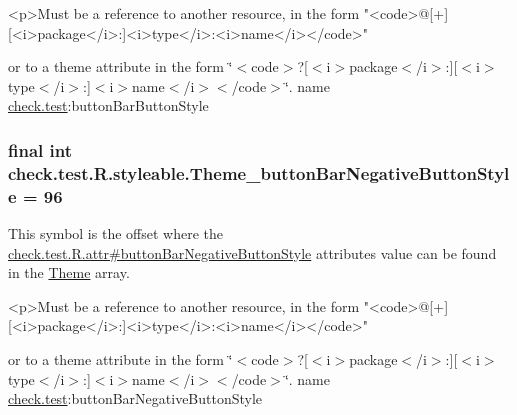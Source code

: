 \begin{DoxyVerb}      <p>Must be a reference to another resource, in the form "<code>@[+][<i>package</i>:]<i>type</i>:<i>name</i></code>"
\end{DoxyVerb}
 or to a theme attribute in the form \char`\"{}$<$code$>$?\mbox{[}$<$i$>$package$<$/i$>$\+:\mbox{]}\mbox{[}$<$i$>$type$<$/i$>$\+:\mbox{]}$<$i$>$name$<$/i$>$$<$/code$>$\char`\"{}.  name \hyperlink{namespacecheck_1_1test}{check.\+test}\+:button\+Bar\+Button\+Style \hypertarget{classcheck_1_1test_1_1_r_1_1styleable_aaf6d54b7d21dd82c42f35041e1ce1c92}{}
\subsubsection[{Theme\+\_\+button\+Bar\+Negative\+Button\+Style}]{\setlength{\rightskip}{0pt plus 5cm}final int check.\+test.\+R.\+styleable.\+Theme\+\_\+button\+Bar\+Negative\+Button\+Style = 96\hspace{0.3cm}{\ttfamily [static]}}\label{classcheck_1_1test_1_1_r_1_1styleable_aaf6d54b7d21dd82c42f35041e1ce1c92}
This symbol is the offset where the \hyperlink{classcheck_1_1test_1_1_r_1_1attr_aa15b2310541c468ff8359b79c844bdb6}{check.\+test.\+R.\+attr\#button\+Bar\+Negative\+Button\+Style} attribute\textquotesingle{}s value can be found in the \hyperlink{classcheck_1_1test_1_1_r_1_1styleable_acca726d02016a0cf607782ec3a436a81}{Theme} array.

\begin{DoxyVerb}      <p>Must be a reference to another resource, in the form "<code>@[+][<i>package</i>:]<i>type</i>:<i>name</i></code>"
\end{DoxyVerb}
 or to a theme attribute in the form \char`\"{}$<$code$>$?\mbox{[}$<$i$>$package$<$/i$>$\+:\mbox{]}\mbox{[}$<$i$>$type$<$/i$>$\+:\mbox{]}$<$i$>$name$<$/i$>$$<$/code$>$\char`\"{}.  name \hyperlink{namespacecheck_1_1test}{check.\+test}\+:button\+Bar\+Negative\+Button\+Style \hypertarget{classcheck_1_1test_1_1_r_1_1styleable_a18a041fde9f2407a8e18b1c7a357e426}{}
